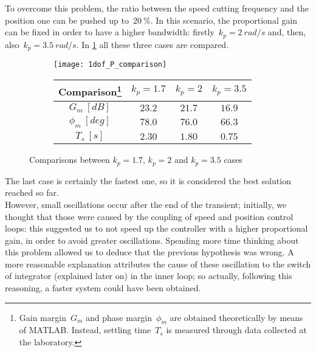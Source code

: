 To overcome this problem, the ratio between the speed cutting frequency and the position one can be pushed up to~$20\ \%$. In this scenario, the proportional gain can be fixed in order to have a higher bandwidth: firstly~$k_p = 2\ rad/s$ and, then, also~$k_p = 3.5\ rad/s$.
In \cref{fig:P1dof_step} all these three cases are compared.
\begin{figure*}[h]
	\centering
	\begin{subfigure}{0.45\columnwidth}
		\texttt{[image: 1dof\_P\_comparison]}
		\label{fig:P1dof_step}
	\end{subfigure}
	\begin{subfigure}{0.45\columnwidth}
		\begin{tabular}{|c|ccc|}
			\hline
			Comparison\footnote{Gain margin~$G_m$ and phase margin~$\phi_m$ are obtained theoretically by means of MATLAB. Instead, settling time~$T_s$ is measured through data collected at the laboratory.} & $k_p=1.7$ & $k_p=2$ & $k_p=3.5$ \\
			\hline
			$G_m\ [dB]$ & $23.2$ & $21.7$ & $16.9$ \\
			$\phi_m\ [deg]$ & $78.0$ & $76.0$ & $66.3$ \\
			\hline
			$T_s\ [s]$ & $2.30$ & $1.80$ & $0.75$ \\
			\hline
		\end{tabular}
	\end{subfigure}
	\caption{Comparisons between $k_p=1.7$, $k_p=2$ and $k_p=3.5$ cases}
	\label{fig:Bode and Step P 1dof comparison}
\end{figure*}
The last case is certainly the fastest one, so it is considered the best solution reached so far. \\
However, small oscillations occur after the end of the transient; initially, we thought that those were caused by the coupling of speed and position control loops: this suggested us to not speed up the controller with a higher proportional gain, in order to avoid greater oscillations. Spending more time thinking about this problem allowed us to deduce that the previous hypothesis was wrong. A more reasonable explanation attributes the cause of these oscillation to the switch of integrator (explained later on) in the inner loop; so actually, following this reasoning, a faster system could have been obtained. \\

